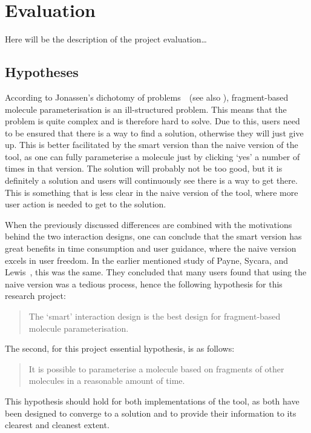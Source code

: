 \chapter{Evaluation}

Here will be the description of the project evaluation\ldots

\nlipsum


\section{Hypotheses}
According to Jonassen's dichotomy of problems~\cite{jonassen2000toward}~(see also ), fragment-based molecule parameterisation is an ill-structured problem. This means that the problem is quite complex and is therefore hard to solve. Due to this, users need to be ensured that there is a way to find a solution, otherwise they will just give up. This is better facilitated by the smart version than the naive version of the tool, as one can fully parameterise a molecule just by clicking `yes' a number of times in that version. The solution will probably not be too good, but it is definitely a solution and users will continuously see there is a way to get there. This is something that is less clear in the naive version of the tool, where more user action is needed to get to the solution.

When the previously discussed differences are combined with the motivations behind the two interaction designs, one can conclude that the smart version has great benefits in time consumption and user guidance, where the naive version excels in user freedom. In the earlier mentioned study of Payne, Sycara, and Lewis~\cite{payne2000varying}, this was the same. They concluded that many users found that using the naive version was a tedious process, hence the following hypothesis for this research project:
\begin{quote}
The `smart' interaction design is the best design for fragment-based molecule parameterisation.
\end{quote}

The second, for this project essential hypothesis, is as follows:
\begin{quote}
It is possible to parameterise a molecule based on fragments of other molecules in a reasonable amount of time.
\end{quote}
This hypothesis should hold for both implementations of the tool, as both have been designed to converge to a solution and to provide their information to its clearest and cleanest extent.


